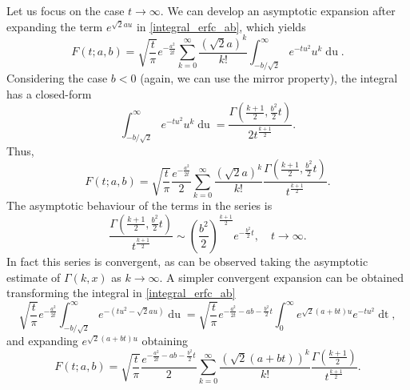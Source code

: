 \documentclass[10pt,a4paper,oneside]{article}
\numberwithin{equation}{section}
\begin{document}
Let us focus on the case $t \to \infty$. We can develop an asymptotic expansion after expanding the term $e^{\sqrt{2}au}$ in \eqref{integral_erfc_ab}, which yields
\begin{equation*}
F(t; a, b) = \sqrt{\frac{t}{\pi}} e^{-\frac{a^2}{2t}} \sum_{k=0}^{\infty}\frac{(\sqrt{2}a)^k}{k!}\int_{-b/\sqrt{2}}^{\infty} e^{-t u^2} u^k \mathop{du}.
\end{equation*}
Considering the case $b < 0$ (again, we can use the mirror property), the integral has a closed-form
\begin{equation*}
\int_{-b/\sqrt{2}}^{\infty} e^{-t u^2} u^k \mathop{du} = \frac{\Gamma\left(\frac{k+1}{2}, \frac{b^2}{2}t\right)}{2 t^{\frac{k+1}{2}}}.
\end{equation*}
Thus,
\begin{equation}\label{phi_expansion_incgamma}
F(t; a, b) = \sqrt{\frac{t}{\pi}} \frac{e^{-\frac{a^2}{2t}}}{2}  \sum_{k=0}^{\infty}\frac{(\sqrt{2}a)^k}{k!} \frac{\Gamma\left(\frac{k+1}{2}, \frac{b^2}{2}t\right)}{t^{\frac{k+1}{2}}}.
\end{equation}
The asymptotic behaviour of the terms in the series is
\begin{equation*}
\frac{\Gamma\left(\frac{k+1}{2}, \frac{b^2}{2}t\right)}{t^{\frac{k+1}{2}}} \sim \left(\frac{b^2}{2}\right)^{\frac{k+1}{2}} e^{-\frac{b^2}{2} t}, \quad t\to\infty.
\end{equation*}
In fact this series is convergent, as can be observed taking the asymptotic estimate of $\Gamma(k, x)$ as $k \to \infty$. A simpler convergent expansion can be obtained transforming the integral in \eqref{integral_erfc_ab}
\begin{equation*}
\sqrt{\frac{t}{\pi}} e^{-\frac{a^2}{2t}} \int_{-b/\sqrt{2}}^{\infty} e^{-(tu^2 - \sqrt{2}au)} \mathop{du} = \sqrt{\frac{t}{\pi}} e^{-\frac{a^2}{2t} -ab - \frac{b^2}{2}t}\int_0^{\infty}e^{\sqrt{2}(a+bt)u} e^{-tu^2}\mathop{dt},
\end{equation*}
and expanding $e^{\sqrt{2}(a+bt)u}$ obtaining
\begin{equation}
F(t; a, b) = \sqrt{\frac{t}{\pi}} \frac{e^{-\frac{a^2}{2t} -ab - \frac{b^2}{2}t}}{2} \sum_{k=0}^{\infty} \frac{(\sqrt{2}(a+bt))^k}{k!}\frac{\Gamma\left(\frac{k+1}{2}\right)}{t^{\frac{k+1}{2}}}.
\end{equation}
\end{document}
